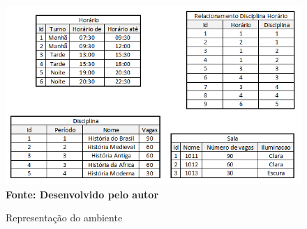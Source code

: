 \begin{figure}[!htb]
\caption[Representação do ambiente]{Representação do ambiente}
\label{fig:figura4}
\centering
\includegraphics[scale=0.9]{imagens/representacaoAmbiente.png}
\\ \textbf{\footnotesize Fonte: Desenvolvido pelo autor}
\end{figure}
